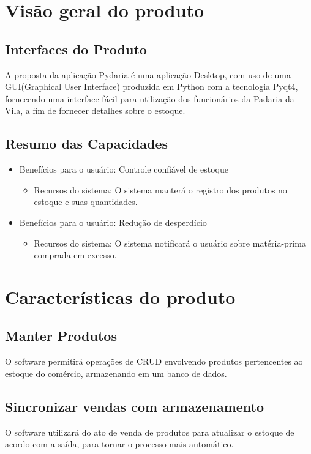 \begin{appendices}
\begin{itemize}
\end{itemize}

\section{Visão geral do produto}

\subsection{Interfaces do Produto}
	A proposta da aplicação Pydaria é uma aplicação Desktop, com uso de uma GUI(Graphical User Interface) produzida em Python com a tecnologia Pyqt4, fornecendo uma interface fácil para utilização dos funcionários da Padaria da Vila, a fim de fornecer detalhes sobre o estoque.

\subsection{Resumo das Capacidades}
	\begin{itemize}
	\item Benefícios para o usuário: Controle confiável de estoque
		\begin{itemize}
			\item Recursos do sistema: O sistema manterá o registro dos produtos no estoque e suas quantidades.
		\end{itemize}

	\item Benefícios para o usuário: Redução de desperdício
		\begin{itemize}
			\item Recursos do sistema: O sistema notificará o usuário sobre matéria-prima comprada em excesso.
		\end{itemize}

	\end{itemize}


\section{Características do produto}

\subsection{Manter Produtos}
	O software permitirá operações de CRUD envolvendo produtos pertencentes ao estoque do comércio, armazenando em um banco de dados.

\subsection{Sincronizar vendas com armazenamento}
	O software utilizará do ato de venda de produtos para atualizar o estoque de acordo com a saída, para tornar o processo mais automático.


\end{appendices}
